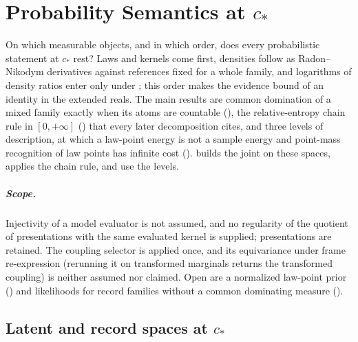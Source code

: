 \chapter{Probability Semantics at \texorpdfstring{$c_*$}{c*}}
\label{ch:probability}

On which measurable objects, and in which order, does every probabilistic statement at $c_*$ rest? Laws
and kernels come first, densities follow as Radon--Nikodym derivatives against references fixed for a
whole family, and logarithms of density ratios enter only under
; this order makes the evidence bound of  an
identity in the extended reals. The main results are common domination of a mixed family exactly when its
atoms are countable (), the relative-entropy chain rule in
$[0,+\infty]$ () that every later decomposition cites, and three levels of
description, at which a law-point energy is not a sample energy and point-mass recognition of law points
has infinite cost ().
 builds the joint on these spaces,  applies the chain rule, and
 use the levels.

\paragraph{Scope.}
Injectivity of a model evaluator is not assumed, and no regularity of the quotient of presentations with
the same evaluated kernel is supplied; presentations are retained. The coupling selector is applied once,
and its equivariance under frame re-expression (rerunning it on transformed marginals returns the
transformed coupling) is neither assumed nor claimed. Open are a normalized law-point prior
() and likelihoods for record families without a common dominating
measure (). 

\section{Latent and record spaces at \texorpdfstring{$c_*$}{c*}}
\label{sec:prob-design}

